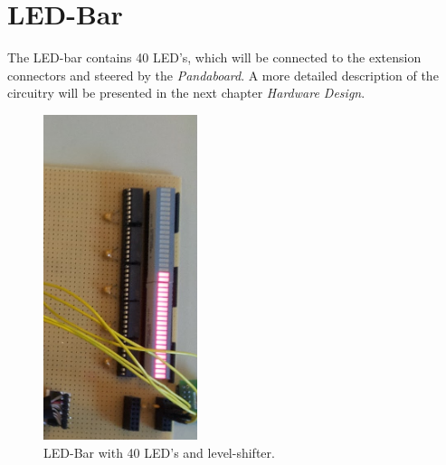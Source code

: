 \newpage
\section{LED-Bar}
The LED-bar contains 40 LED's, which will be connected to the extension connectors and steered by the \textit{Pandaboard}. A more detailed description of the  circuitry will be presented in the next chapter \textit{Hardware Design}. 
\begin{figure}[H]
   \centering
   \includegraphics[width=0.4\textwidth, angle=90]{img/LED-Bar.png}%
   \caption{LED-Bar with 40 LED's and level-shifter.}
   \label{fig:ledBar}%
\end{figure}

